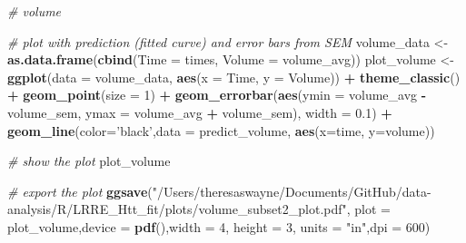 \documentclass[]{article}
\newenvironment{Shaded}{\begin{snugshade}}{\end{snugshade}}
\newcommand{\CommentTok}[1]{\textcolor[rgb]{0.56,0.35,0.01}{\textit{#1}}}
\newcommand{\DataTypeTok}[1]{\textcolor[rgb]{0.13,0.29,0.53}{#1}}
\newcommand{\DecValTok}[1]{\textcolor[rgb]{0.00,0.00,0.81}{#1}}
\newcommand{\FloatTok}[1]{\textcolor[rgb]{0.00,0.00,0.81}{#1}}
\newcommand{\KeywordTok}[1]{\textcolor[rgb]{0.13,0.29,0.53}{\textbf{#1}}}
\newcommand{\NormalTok}[1]{#1}
\newcommand{\OperatorTok}[1]{\textcolor[rgb]{0.81,0.36,0.00}{\textbf{#1}}}
\newcommand{\StringTok}[1]{\textcolor[rgb]{0.31,0.60,0.02}{#1}}
\begin{document}
\begin{Shaded}
\begin{Highlighting}[]
\CommentTok{# volume}

\CommentTok{# plot with prediction (fitted curve) and error bars from SEM}
\NormalTok{volume_data <-}\StringTok{ }\KeywordTok{as.data.frame}\NormalTok{(}\KeywordTok{cbind}\NormalTok{(}\DataTypeTok{Time =}\NormalTok{ times, }\DataTypeTok{Volume =}\NormalTok{ volume_avg))}
\NormalTok{plot_volume <-}\StringTok{ }\KeywordTok{ggplot}\NormalTok{(}\DataTypeTok{data =}\NormalTok{ volume_data, }\KeywordTok{aes}\NormalTok{(}\DataTypeTok{x =}\NormalTok{ Time, }\DataTypeTok{y =}\NormalTok{ Volume)) }\OperatorTok{+}
\StringTok{  }\KeywordTok{theme_classic}\NormalTok{() }\OperatorTok{+}
\StringTok{  }\KeywordTok{geom_point}\NormalTok{(}\DataTypeTok{size =} \DecValTok{1}\NormalTok{) }\OperatorTok{+}
\StringTok{  }\KeywordTok{geom_errorbar}\NormalTok{(}\KeywordTok{aes}\NormalTok{(}\DataTypeTok{ymin =}\NormalTok{ volume_avg }\OperatorTok{-}\StringTok{ }\NormalTok{volume_sem, }\DataTypeTok{ymax =}\NormalTok{ volume_avg }\OperatorTok{+}\StringTok{ }\NormalTok{volume_sem),}
                \DataTypeTok{width =} \FloatTok{0.1}\NormalTok{) }\OperatorTok{+}
\StringTok{  }\KeywordTok{geom_line}\NormalTok{(}\DataTypeTok{color=}\StringTok{'black'}\NormalTok{,}\DataTypeTok{data =}\NormalTok{ predict_volume, }\KeywordTok{aes}\NormalTok{(}\DataTypeTok{x=}\NormalTok{time, }\DataTypeTok{y=}\NormalTok{volume))}

\CommentTok{# show the plot }
\NormalTok{plot_volume}

\CommentTok{# export the plot}
\KeywordTok{ggsave}\NormalTok{(}\StringTok{"/Users/theresaswayne/Documents/GitHub/data-analysis/R/LRRE_Htt_fit/plots/volume_subset2_plot.pdf"}\NormalTok{, }\DataTypeTok{plot =}\NormalTok{ plot_volume,}\DataTypeTok{device =} \KeywordTok{pdf}\NormalTok{(),}\DataTypeTok{width =} \DecValTok{4}\NormalTok{, }\DataTypeTok{height =} \DecValTok{3}\NormalTok{, }\DataTypeTok{units =} \StringTok{"in"}\NormalTok{,}\DataTypeTok{dpi =} \DecValTok{600}\NormalTok{)}
\end{Highlighting}
\end{Shaded}
\end{document}
